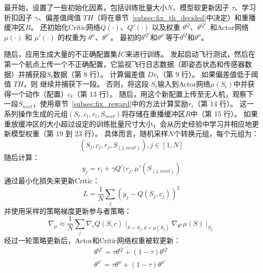 

最开始，\nyctea 设置了一些初始化因素，包括训练批量大小$N$、模型软更新因子 $\tau$、学习折扣因子 $\gamma$、偏差值阈值 $TH$（将在章节~\ref{subsec:fix_th_decided}中决定）和重播缓冲区$R$。
\nyctea 还初始化Critic网络$Q(\cdot)$、$Q'(\cdot)$ 以及权重 $\theta^{Q}$、$\theta^{Q'}$\ 和Actor网络 $\mu (\cdot)$ 和 $\mu'(\cdot)$ 的权重为 $\theta^{\mu}$、$\theta^{\mu'}$。
最初的$\theta^{Q'}$和$\theta^{\mu'}$等于$\theta^{Q}$和$\theta^{\mu}$。

随后，应用生成大量的不正确配置集$IC$来进行训练。
\nyctea 发起启动飞行测试，然后在第一个航点上传一个不正确配置，它监视飞行日志数据（即姿态状态和传感器数据）并捕获段$S_t$数据（第 8 行）。
\nyctea 计算偏差值 $Dv_t$（第 9 行）。
如果偏差值低于阈值 $TH$，则 \nyctea 继续并捕获下一段。
否则，\nyctea 将这段 $S_t$输入到Actor网络$\mu(S_t)$中并获得一个动作（配置）$c_t$（第 13 行）。
随后，\nyctea 用这个新配置上传至无人机，观察下一段$S_{next}$，使用章节~\ref{subsec:fix_reward}中的方法计算奖励$r_t$（第 14 行）。
这一系列操作生成的元组$(S_t, c_t, r_t, S_{next})$将存储在重播缓冲区$R$中（第 15 行）。
如果重放缓冲区的大小超过设定的训练批量尺寸大小，\nyctea 会从历史经验中学习并相应地更新模型权重（第 19 到 23 行）。
具体而言，\nyctea 随机采样$N$个转换元组，每个元组为：
\begin{equation}
    (S_j, c_j, r_j, S_{(j,next)}), j \in [1, N]
\end{equation}
\nyctea 随后计算：
\begin{equation}
    y_j = r_t + \gamma Q'(r_j, \mu'(S_{(j,next)})
\end{equation}
\nyctea 通过最小化损失来更新Critic：
\begin{equation}\label{eq:loss}
    L = \frac{1}{N}\sum_{j}(y_j - Q(S_j, c_j))^2
\end{equation}
并使用采样的策略梯度更新参与者策略：
\begin{equation}\label{eq:policy}
    \nabla_{\mu} \approx \frac{1}{N} \sum_{j}\nabla_{c}Q(S,c)\mid_{S=S_j, d=\mu(S_j)}\nabla_{\theta^{\mu}}\mu(S)\mid_{S_j}
\end{equation}
经过一轮策略更新后，Actor和Critic网络权重被软更新：
\begin{equation}\label{eq:sigma}
    \begin{aligned}
        \theta^{Q'} = \tau \theta^{Q} + (1-\tau)\theta^{Q'} \\
        \theta^{\mu'} = \tau \theta^{\mu} + (1-\tau)\theta^{\mu'}
    \end{aligned}
\end{equation}

